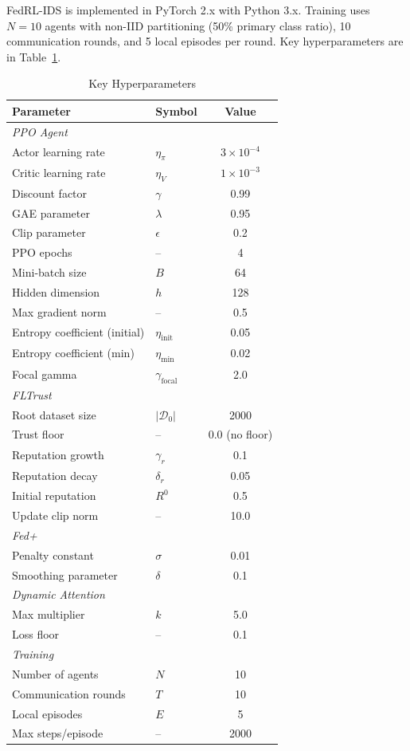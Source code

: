 \documentclass[conference]{IEEEtran}
\begin{document}
FedRL-IDS is implemented in PyTorch 2.x with Python 3.x. Training uses $N=10$ agents with non-IID partitioning (50\% primary class ratio), 10 communication rounds, and 5 local episodes per round. Key hyperparameters are in Table~\ref{tab:hyperparams}.

\begin{table}[t]
\centering
\caption{Key Hyperparameters}
\label{tab:hyperparams}
\begin{tabular}{llc}
\toprule
\textbf{Parameter} & \textbf{Symbol} & \textbf{Value} \\
\midrule
\multicolumn{3}{l}{\textit{PPO Agent}} \\
Actor learning rate & $\eta_{\pi}$ & $3\times10^{-4}$ \\
Critic learning rate & $\eta_V$ & $1\times10^{-3}$ \\
Discount factor & $\gamma$ & 0.99 \\
GAE parameter & $\lambda$ & 0.95 \\
Clip parameter & $\epsilon$ & 0.2 \\
PPO epochs & -- & 4 \\
Mini-batch size & $B$ & 64 \\
Hidden dimension & $h$ & 128 \\
Max gradient norm & -- & 0.5 \\
Entropy coefficient (initial) & $\eta_{\mathrm{init}}$ & 0.05 \\
Entropy coefficient (min) & $\eta_{\min}$ & 0.02 \\
Focal gamma & $\gamma_{\mathrm{focal}}$ & 2.0 \\
\midrule
\multicolumn{3}{l}{\textit{FLTrust}} \\
Root dataset size & $|\mathcal{D}_0|$ & 2000 \\
Trust floor & -- & 0.0 (no floor) \\
Reputation growth & $\gamma_r$ & 0.1 \\
Reputation decay & $\delta_r$ & 0.05 \\
Initial reputation & $R^0$ & 0.5 \\
Update clip norm & -- & 10.0 \\
\midrule
\multicolumn{3}{l}{\textit{Fed+}} \\
Penalty constant & $\sigma$ & 0.01 \\
Smoothing parameter & $\delta$ & 0.1 \\
\midrule
\multicolumn{3}{l}{\textit{Dynamic Attention}} \\
Max multiplier & $k$ & 5.0 \\
Loss floor & -- & 0.1 \\
\midrule
\multicolumn{3}{l}{\textit{Training}} \\
Number of agents & $N$ & 10 \\
Communication rounds & $T$ & 10 \\
Local episodes & $E$ & 5 \\
Max steps/episode & -- & 2000 \\
\bottomrule
\end{tabular}
\end{table}
\end{document}
